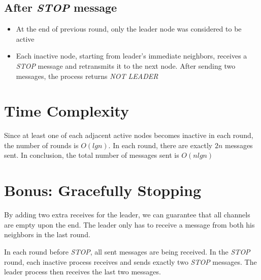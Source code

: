 \documentclass{article}
\begin{document}
\subsection{After \textit{STOP} message}
\begin{itemize}
    \item At the end of previous round, only the leader node was considered to be active
    \item Each inactive node, starting from leader's immediate neighbors, receives a \textit{STOP} message and retransmits it to the next node. After sending two messages, the process returns \textit{NOT LEADER}
\end{itemize}
\section{Time Complexity}
Since at least one of each adjacent active nodes becomes inactive in each round, the number of rounds is $O(lgn)$. In each round, there are exactly $2n$ messages sent. In conclusion, the total number of messages sent is $O(nlgn)$
\section{Bonus: Gracefully Stopping}
By adding two extra receives for the leader, we can guarantee that all channels are empty upon the end. The leader only has to receive a message from both his neighbors in the last round.

In each round before \textit{STOP}, all sent messages are being received.
In the \textit{STOP} round, each inactive process receives and sends exactly two \textit{STOP} messages. The leader process then receives the last two messages.

\printbibliography
\end{document}

